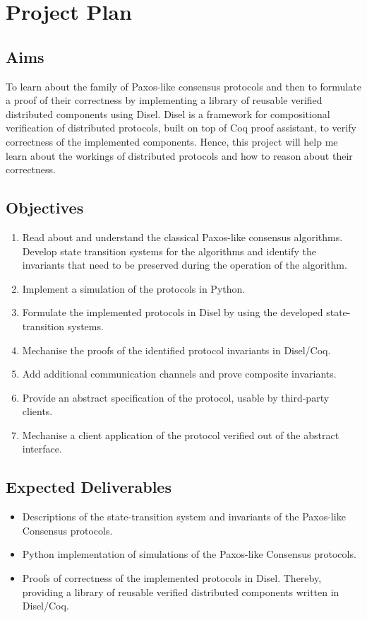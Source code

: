 \chapter{Project Plan}

\section{Aims}
To learn about the family of Paxos-like consensus protocols and then to formulate a proof of their correctness by implementing a library of reusable verified distributed components using Disel. Disel is a framework for compositional verification of distributed protocols, built on top of Coq proof assistant, to verify correctness of the implemented components.
Hence, this project will help me learn about the workings of distributed protocols and how to reason about their correctness.

\section{Objectives}
\begin{enumerate}
  \item Read about and understand the classical Paxos-like consensus algorithms. Develop state transition systems for the algorithms and identify the invariants that need to be preserved during the operation of the algorithm.
  \item Implement a simulation of the protocols in Python.
  \item Formulate the implemented protocols in Disel by using the developed state-transition systems.
  \item Mechanise the proofs of the identified protocol invariants in Disel/Coq.
  \item Add additional communication channels and prove composite invariants.
  \item Provide an abstract specification of the protocol, usable by third-party clients.
  \item Mechanise a client application of the protocol verified out of the abstract interface.
\end{enumerate}

\section{Expected Deliverables}
\begin{itemize}
  \item Descriptions of the state-transition system and invariants of the Paxos-like Consensus protocols.
  \item Python implementation of simulations of the Paxos-like Consensus protocols.
  \item Proofs of correctness of the implemented protocols in Disel. Thereby, providing a library of reusable verified distributed components written in Disel/Coq.
\end{itemize}

